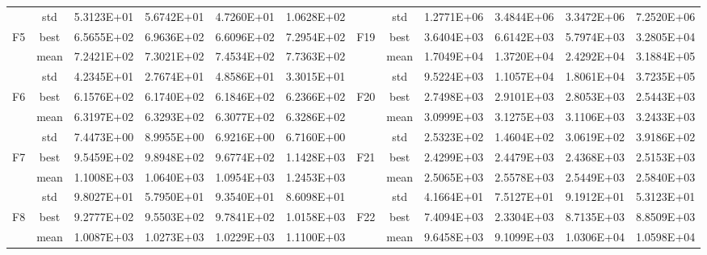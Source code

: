 \documentclass{wzuthesis}
\begin{document}
\begin{table}[htbp]
\begin{tabular}{rrrrrrccrrrr}
          & \multicolumn{1}{c}{std} & 5.3123E+01 & 5.6742E+01 & 4.7260E+01 & 1.0628E+02 &       & std   & 1.2771E+06 & 3.4844E+06 & 3.3472E+06 & 7.2520E+06 \\
    \multicolumn{1}{c}{\multirow{3}[0]{*}{F5}} & \multicolumn{1}{c}{best} & 6.5655E+02 & 6.9636E+02 & 6.6096E+02 & 7.2954E+02 & \multirow{3}[0]{*}{F19} & best  & 3.6404E+03 & 6.6142E+03 & 5.7974E+03 & 3.2805E+04 \\
          & \multicolumn{1}{c}{mean} & 7.2421E+02 & 7.3021E+02 & 7.4534E+02 & 7.7363E+02 &       & mean  & 1.7049E+04 & 1.3720E+04 & 2.4292E+04 & 3.1884E+05 \\
          & \multicolumn{1}{c}{std} & 4.2345E+01 & 2.7674E+01 & 4.8586E+01 & 3.3015E+01 &       & std   & 9.5224E+03 & 1.1057E+04 & 1.8061E+04 & 3.7235E+05 \\
    \multicolumn{1}{c}{\multirow{3}[0]{*}{F6}} & \multicolumn{1}{c}{best} & 6.1576E+02 & 6.1740E+02 & 6.1846E+02 & 6.2366E+02 & \multirow{3}[0]{*}{F20} & best  & 2.7498E+03 & 2.9101E+03 & 2.8053E+03 & 2.5443E+03 \\
          & \multicolumn{1}{c}{mean} & 6.3197E+02 & 6.3293E+02 & 6.3077E+02 & 6.3286E+02 &       & mean  & 3.0999E+03 & 3.1275E+03 & 3.1106E+03 & 3.2433E+03 \\
          & \multicolumn{1}{c}{std} & 7.4473E+00 & 8.9955E+00 & 6.9216E+00 & 6.7160E+00 &       & std   & 2.5323E+02 & 1.4604E+02 & 3.0619E+02 & 3.9186E+02 \\
    \multicolumn{1}{c}{\multirow{3}[0]{*}{F7}} & \multicolumn{1}{c}{best} & 9.5459E+02 & 9.8948E+02 & 9.6774E+02 & 1.1428E+03 & \multirow{3}[0]{*}{F21} & best  & 2.4299E+03 & 2.4479E+03 & 2.4368E+03 & 2.5153E+03 \\
          & \multicolumn{1}{c}{mean} & 1.1008E+03 & 1.0640E+03 & 1.0954E+03 & 1.2453E+03 &       & mean  & 2.5065E+03 & 2.5578E+03 & 2.5449E+03 & 2.5840E+03 \\
          & \multicolumn{1}{c}{std} & 9.8027E+01 & 5.7950E+01 & 9.3540E+01 & 8.6098E+01 &       & std   & 4.1664E+01 & 7.5127E+01 & 9.1912E+01 & 5.3123E+01 \\
    \multicolumn{1}{c}{\multirow{3}[0]{*}{F8}} & \multicolumn{1}{c}{best} & 9.2777E+02 & 9.5503E+02 & 9.7841E+02 & 1.0158E+03 & \multirow{3}[0]{*}{F22} & best  & 7.4094E+03 & 2.3304E+03 & 8.7135E+03 & 8.8509E+03 \\
          & \multicolumn{1}{c}{mean} & 1.0087E+03 & 1.0273E+03 & 1.0229E+03 & 1.1100E+03 &       & mean  & 9.6458E+03 & 9.1099E+03 & 1.0306E+04 & 1.0598E+04 \\

\end{tabular}
\end{table}
\end{document}
